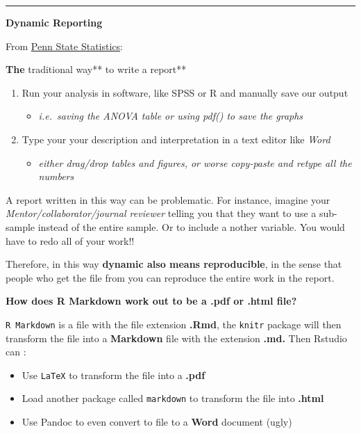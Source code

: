 \documentclass[]{book}
\providecommand{\tightlist}{%
  \setlength{\itemsep}{0pt}\setlength{\parskip}{0pt}}
\theoremstyle{definition}
\theoremstyle{definition}
\theoremstyle{definition}
\theoremstyle{remark}
\begin{document}
\begin{center}\rule{0.5\linewidth}{\linethickness}\end{center}

\textbf{Dynamic Reporting}

From
\href{https://onlinecourses.science.psu.edu/statprogram/markdown}{Penn
State Statistics}:

\textbf{The }traditional way** to write a report**

\begin{enumerate}
\def\labelenumi{\arabic{enumi}.}
\tightlist
\item
  Run your analysis in software, like SPSS or R and manually save our
  output

  \begin{itemize}
  \tightlist
  \item
    \emph{i.e.~saving the ANOVA table or using pdf() to save the graphs}
  \end{itemize}
\item
  Type your your description and interpretation in a text editor like
  \emph{Word}

  \begin{itemize}
  \tightlist
  \item
    \emph{either drag/drop tables and figures, or worse copy-paste and
    retype all the numbers}
  \end{itemize}
\end{enumerate}

A report written in this way can be problematic. For instance, imagine
your \emph{Mentor/collaborator/journal reviewer} telling you that they
want to use a sub-sample instead of the entire sample. Or to include a
nother variable. You would have to redo all of your work!!

Therefore, in this way \textbf{dynamic also means reproducible}, in the
sense that people who get the file from you can reproduce the entire
work in the report.

\textbf{How does R Markdown work out to be a .pdf or .html file?}

\texttt{R\ Markdown} is a file with the file extension \textbf{.Rmd},
the \texttt{knitr} package will then transform the file into a
\textbf{Markdown} file with the extension \textbf{.md.} Then Rstudio can
\citep{xie2015}:

\begin{itemize}
\item
  Use \texttt{LaTeX} to transform the file into a \textbf{.pdf}
\item
  Load another package called \texttt{markdown} to transform the file
  into \textbf{.html}
\item
  Use Pandoc to even convert to file to a \textbf{Word} document (ugly)
\end{itemize}
\end{document}
